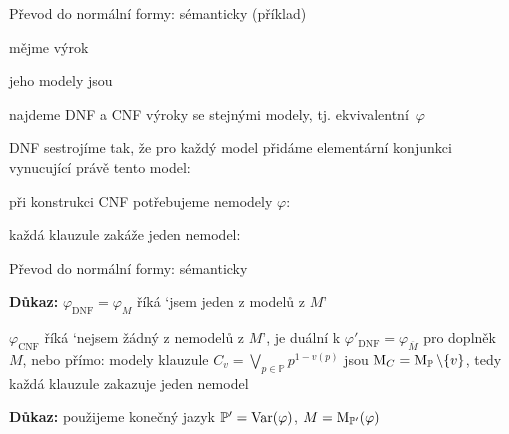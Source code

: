 \documentclass{beamer}
\begin{document}
\begin{frame}{Převod do normální formy: sémanticky (příklad)}

mějme výrok 

jeho modely jsou 

najdeme DNF a CNF výroky se stejnými modely, tj. ekvivalentní~$\varphi$

DNF sestrojíme tak, že pro každý model přidáme elementární konjunkci vynucující právě tento model:    

při konstrukci CNF potřebujeme \alert{nemodely} $\varphi$: 

každá klauzule zakáže jeden nemodel: 
\end{frame}


\begin{frame}{Převod do normální formy: sémanticky}

\vspace{-6pt}
\textbf{Důkaz:} $\varphi_{\mathrm{DNF}}=\varphi_M$ říká  \alert{`jsem jeden z modelů z $M$'}

$\varphi_{\mathrm{CNF}}$ říká \alert{`nejsem žádný z nemodelů z $M$'}, je duální k $\varphi'_{\mathrm{DNF}}=\varphi_{\overline{M}}$ pro doplněk $M$, nebo přímo: modely klauzule $C_v=\bigvee_{p\in\mathbb P}p^{1-v(p)}$ jsou $\operatorname{M}_C=\operatorname{M}_\mathbb P\setminus\{v\}$, tedy každá klauzule zakazuje jeden nemodel\hfill\qedsymbol

\medskip
{}

\vspace{-12pt}
\textbf{Důkaz:} použijeme konečný jazyk $\mathbb P'=\operatorname{Var}(\varphi)$, $M=\operatorname{M}_{\mathbb P'}(\varphi)$\hfill\qedsymbol

\end{frame}
\end{document}
